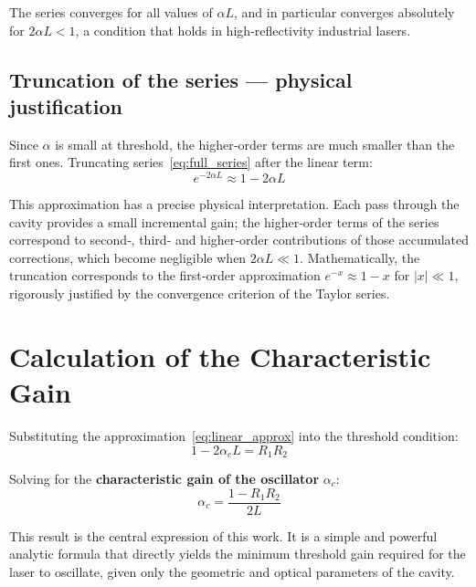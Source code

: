 \documentclass[12pt, a4paper]{article}
\begin{document}
The series converges for all values of $\alpha L$, and in particular converges absolutely
for $2\alpha L < 1$, a condition that holds in high‑reflectivity industrial lasers.

\subsection{Truncation of the series — physical justification}

Since $\alpha$ is small at threshold, the higher‑order terms are much smaller than the
first ones. Truncating series~\eqref{eq:full_series} after the linear term:
%
\begin{equation}
  \boxed{e^{-2\alpha L} \approx 1 - 2\alpha L}
  \label{eq:linear_approx}
\end{equation}

This approximation has a precise physical interpretation. Each pass through the cavity
provides a small incremental gain; the higher‑order terms of the series correspond to
second‑, third‑ and higher‑order contributions of those accumulated corrections, which
become negligible when $2\alpha L \ll 1$.
Mathematically, the truncation corresponds to the first‑order approximation
$e^{-x} \approx 1 - x$ for $|x| \ll 1$, rigorously justified by the convergence
criterion of the Taylor series.

\section{Calculation of the Characteristic Gain}

Substituting the approximation~\eqref{eq:linear_approx} into the threshold condition:
%
\begin{equation}
  1 - 2\alpha_c L = R_1 R_2
\end{equation}

Solving for the \textbf{characteristic gain of the oscillator} $\alpha_c$:
%
\begin{equation}
  \boxed{\alpha_c = \frac{1 - R_1 R_2}{2L}}
  \label{eq:gain}
\end{equation}

This result is the central expression of this work. It is a simple and powerful analytic
formula that directly yields the minimum threshold gain required for the laser to oscillate,
given only the geometric and optical parameters of the cavity.

\end{document}

